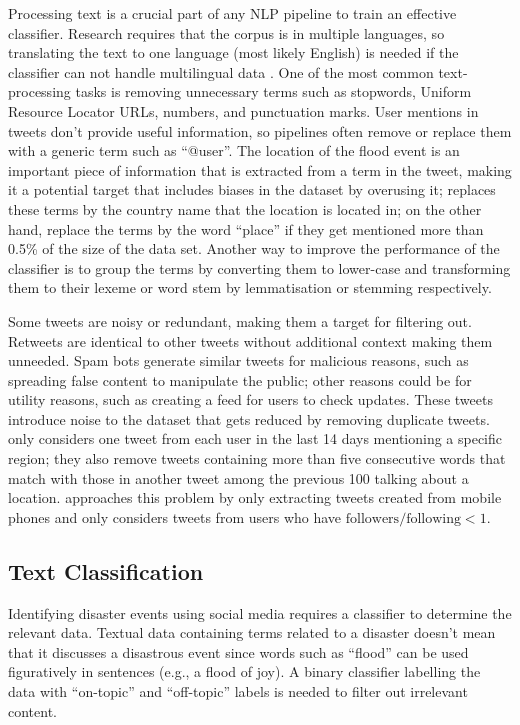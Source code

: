 Processing text is a crucial part of any \ac{NLP} pipeline to train an effective classifier.
Research requires that the corpus is in multiple languages, so translating the text to one language
(most likely English) is needed if the classifier can not handle multilingual data
\cite{singhEventClassificationLocation2019}. One of the most common text-processing tasks is
removing unnecessary terms such as stopwords, Uniform Resource Locator URLs, numbers, and
punctuation marks. User mentions in tweets don't provide useful information, so pipelines often
remove or replace them with a generic term such as
``@user''\cite{debruijnImprovingClassificationFlood2020}. The location of the flood event is an
important piece of information that is extracted from a term in the tweet, making it a potential
target that includes biases in the dataset by overusing it;
 replaces these terms by the country name that
the location is located in; on the other hand,
 replace the terms by the word ``place'' if
they get mentioned more than 0.5\% of the size of the data set. Another way to improve the
performance of the classifier is to group the terms by converting them to lower-case and
transforming them to their lexeme or word stem by lemmatisation or stemming respectively.

Some tweets are noisy or redundant, making them a target for filtering out. Retweets are identical
to other tweets without additional context making them unneeded. Spam bots generate similar tweets
for malicious reasons, such as spreading false content to manipulate the public; other reasons could
be for utility reasons, such as creating a feed for users to check updates. These tweets introduce
noise to the dataset that gets reduced by removing duplicate tweets.
 only considers one tweet from each user in the last
14 days mentioning a specific region; they also remove tweets containing more than five consecutive
words that match with those in another tweet among the previous 100 talking about a location.
 approaches this problem by only extracting tweets
created from mobile phones and only considers tweets from users who have $\text{followers} /
\text{following} < 1$.

\subsection{Text Classification}
Identifying disaster events using social media requires a classifier to determine the relevant data.
Textual data containing terms related to a disaster doesn't mean that it discusses a disastrous
event since words such as ``flood'' can be used figuratively in sentences (e.g., a flood of joy). A
binary classifier labelling the data with ``on-topic'' and ``off-topic'' labels is needed to filter
out irrelevant content.

